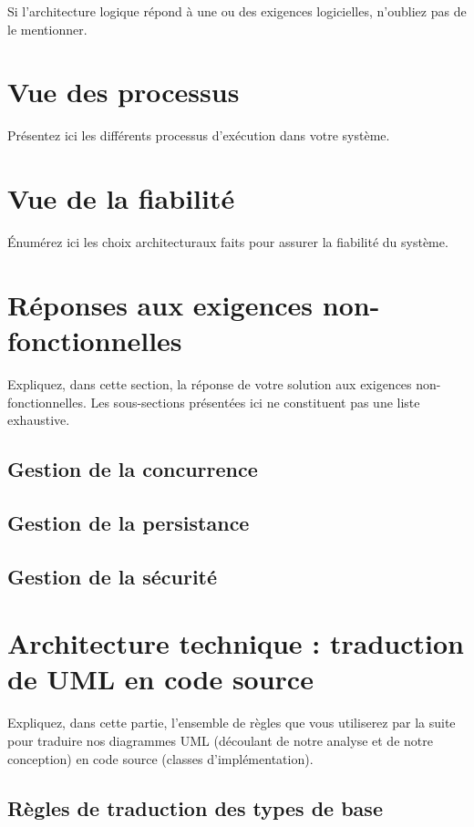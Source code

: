 Si l'architecture logique répond à une ou des exigences logicielles, n'oubliez pas de le mentionner.


\section{Vue des processus}
Présentez ici les différents processus d'exécution dans votre système.

\section{Vue de la fiabilité}

Énumérez ici les choix architecturaux faits pour assurer la fiabilité du système.


\section{Réponses aux exigences non-fonctionnelles}
Expliquez, dans cette section, la réponse de votre solution aux exigences non-fonctionnelles. 
Les sous-sections présentées ici ne constituent pas une liste exhaustive. 

\subsection{Gestion de la concurrence}

\subsection{Gestion de la persistance}

\subsection{Gestion de la sécurité}


\section{Architecture technique : traduction de UML en code source}
Expliquez, dans cette partie, l'ensemble de règles que vous utiliserez par la suite pour traduire nos diagrammes \textsc{UML} (découlant de notre analyse et de notre conception) en code source (classes d'implémentation).\\ 

\subsection{Règles de traduction des types de base}

